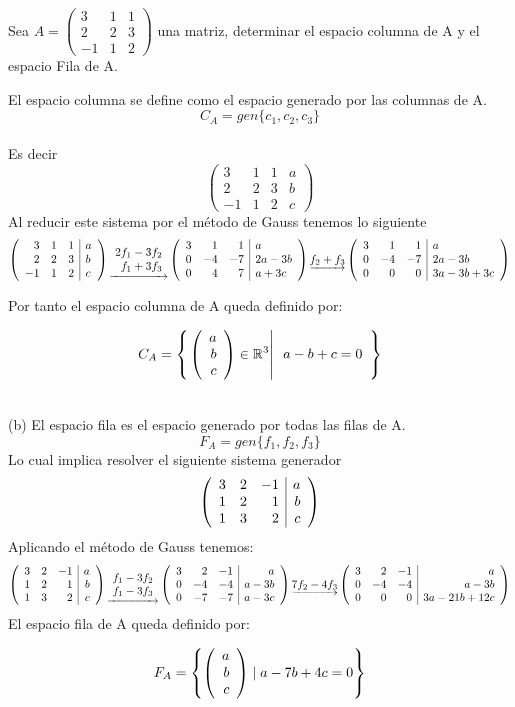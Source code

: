 \begin{ejercicio}
Sea $A=
\left(
\begin{array}{rrr}
3&1&1\\
2&2&3\\
-1&1&2
\end{array}
\right)$ una matriz, determinar el espacio columna de A y el espacio Fila de A.


\sol
El espacio columna se define como el espacio generado por las columnas de A.
\[C_A=gen\{c_1, c_2, c_3\}\]
~\\
Es decir
$$\left(
\begin{array}{rrr|r}
3&1&1&a\\
2&2&3&b\\
-1&1&2&c
\end{array}
\right)$$
Al reducir este sistema por el método de Gauss tenemos lo siguiente
$$\reducir{{rrr|l}}{3&1&1&a\\2&2&3&b\\-1&1&2&c}
\underrightarrow{\begin{array}{r}
    2f_1 - 3f_2 \\
    f_1 + 3f_3
\end{array}}
\reducir{rrr|l}{3&1&1&a\\0&-4&-7&2a-3b\\0&4&7&a+3c}
\underrightarrow{f_2 + f_3}
\reducir{rrr|l}{3&1&1&a\\0&-4&-7&2a-3b\\0&0&0&3a-3b+3c}$$

 Por tanto el espacio columna de A queda definido por:
 
\[C_A=\llaves{\vectrtres{a}{b}{c} \in \rtres}
{\begin{array}{r}
a-b+c=0\\
\end{array}}
\]

~\\
(b) El espacio fila es el espacio generado por todas las filas de A. 
\[F_A=gen\{f_1, f_2, f_3\}\]
Lo cual implica resolver el siguiente sistema generador
$$\reducir{rrr|r}{
3&2&-1&a\\
1&2&1&b\\
1&3&2&c}$$
Aplicando el método de Gauss tenemos:~
$$\reducir{rrr|r}{
3&2&-1&a\\
1&2&1&b\\
1&3&2&c}
\underrightarrow{\begin{array}{c}
    f_1 - 3f_2\\
    f_1 - 3f_3
\end{array}}
\reducir{rrr|r}{
3&2&-1&a\\
0&-4&-4&a-3b\\
0&-7&-7&a-3c
}
\underrightarrow{7f_2 - 4f_3}
\reducir{rrr|r}{
3&2&-1&a\\
0&-4&-4&a-3b\\
0&0&0&3a-21b+12c}
$$
El espacio fila de A queda definido por:
 
 \[F_A=\left\lbrace  \vectrtres{a}{b}{c} \mid a-7b+4c=0 \right\rbrace  \]



\end{ejercicio}


